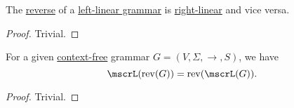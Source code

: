 \begin{proposition}\label{thm:reverse_linear_grammar}
  The \hyperref[def:reverse_grammar]{reverse} of a \hyperref[def:chomsky_hierarchy/regular]{left-linear grammar} is \hyperref[def:chomsky_hierarchy/regular]{right-linear} and vice versa.
\end{proposition}
\begin{proof}
  Trivial.
\end{proof}

\begin{proposition}\label{thm:reverse_grammar_language}
  For a given \hyperref[def:chomsky_hierarchy/context_free]{context-free} grammar \( G = (V, \Sigma, \to, S) \), we have
  \begin{equation*}
    \mscrL(\op{rev}(G)) = \op{rev}(\mscrL(G)).
  \end{equation*}
\end{proposition}
\begin{proof}
  Trivial.
\end{proof}

